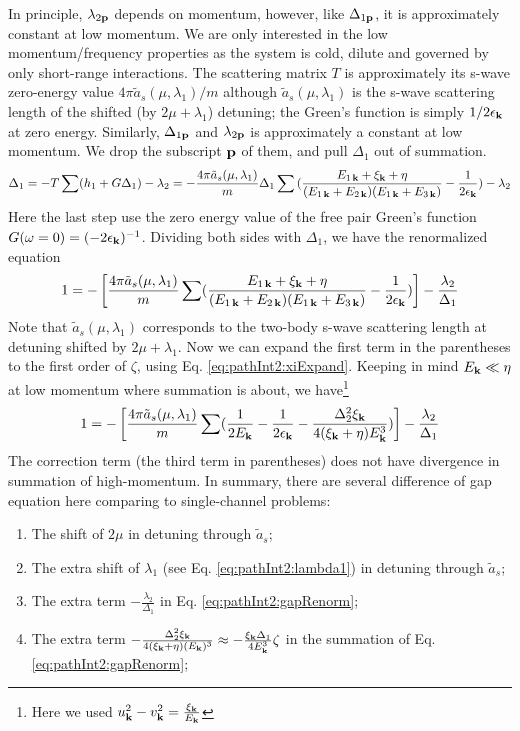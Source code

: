 In principle, $\lambda_{2\mathbf{p}}$ depends on momentum, however, like $\Delta_{1\mathbf{p}}$, it is approximately constant at low momentum.
We are only interested in the low momentum/frequency properties as the system is cold, dilute and governed by only short-range interactions. The scattering matrix $T$ is approximately its s-wave zero-energy value ${4\pi{\tilde{a}_{s}(\mu,\lambda_{1})}}/{m}$ although $\tilde{a}_{s}(\mu,\lambda_{1})$ is the s-wave scattering length of the shifted (by $2\mu+\lambda_{1}$) detuning; the Green's function is simply $1/2\epsilon_{\mathbf{k}}$ at zero energy.   Similarly,   $\Delta_{1\mathbf{p}}$ and $\lambda_{2\mathbf{p}}$ is approximately a constant at low momentum.  We drop the subscript $\mathbf{p}$ of them, and pull $\Delta_{1}$ out of summation. 
\begin{equation}
\Delta_{1}=-T\sum(h_{1}+G\Delta_{1})-\lambda_{2}
=-\frac{4\pi{\tilde{a}_{s}(\mu,\lambda_{1})}}{m}\Delta_{1}\sum{}(\frac{E_{1\,\mathbf{k}}+\xi_{\mathbf{k}}+\eta}{(E_{1\,\mathbf{k}}+E_{2\,\mathbf{k}})(E_{1\,\mathbf{k}}+E_{3\,\mathbf{k}})}-\frac{1}{2\epsilon_{\mathbf{k}}})
	-\lambda_{2}
\end{equation}
Here the last step use the zero energy value of the free pair Green's function $G(\omega=0)=(-2\epsilon_{\mathbf{k}})^{-1}$. Dividing both sides with $\Delta_{1}$, we have the renormalized equation
\begin{equation}
1=-\left[\frac{4\pi{\tilde{a}_{s}(\mu,\lambda_{1})}}{m}\sum(\frac{E_{1\,\mathbf{k}}+\xi_{\mathbf{k}}+\eta}{(E_{1\,\mathbf{k}}+E_{2\,\mathbf{k}})(E_{1\,\mathbf{k}}+E_{3\,\mathbf{k}})}-\frac{1}{2\epsilon_{\mathbf{k}}})\right]
	-\frac{\lambda_{2}}{\Delta_{1}}
\end{equation}
Note that $\tilde{a}_{s}(\mu,\lambda_{1})$ corresponds to the two-body s-wave scattering length at detuning shifted by $2\mu+\lambda_{1}$.
Now we can expand the first term in the parentheses to the first order of $\zeta$, using Eq. \ref{eq:pathInt2:xiExpand}. Keeping in mind $E_{\mathbf{k}}\ll{\eta}$ at low momentum where summation is about, we have\footnote{Here we used $u_{\mathbf{k}}^{2}-v_{\mathbf{k}}^{2}=\frac{\xi_{\mathbf{k}}}{E_{\mathbf{k}}}$}
\begin{equation}\label{eq:pathInt2:gapRenorm}
1=-\left[\frac{4\pi{\tilde{a}_{s}(\mu,\lambda_{1})}}{m}\sum(\frac{1}{2E_{\mathbf{k}}}-\frac{1}{2\epsilon_{\mathbf{k}}}-\frac{\Delta_{2}^{2}\xi_{\mathbf{k}}}{4(\xi_{\mathbf{k}}+\eta){E_{\mathbf{k}}^{3}}})\right]
	-\frac{\lambda_{2}}{\Delta_{1}}
\end{equation}
The correction term (the third term in parentheses) does not have divergence in summation of high-momentum. 
In summary, there are several difference of gap equation here comparing to single-channel problems:
\begin{enumerate}
\item\label{item:pathInt2:mu}The shift of $2\mu$ in detuning through $\tilde{a}_{s}$;
\item The extra shift of $\lambda_{1}$ (see Eq. \ref{eq:pathInt2:lambda1}) in detuning through $\tilde{a}_{s}$;
\item The extra term $-\frac{\lambda_{2}}{\Delta_{1}}$ in Eq. \ref{eq:pathInt2:gapRenorm};
\item The extra term $-\frac{\Delta_{2}^{2}\xi_{\mathbf{k}}}{4(\xi_{\mathbf{k}}+\eta){(E_{\mathbf{k}})^{3}}}\approx-\frac{\xi_{\mathbf{k}}\Delta_{1}}{4{E_{\mathbf{k}}^{3}}}\zeta$ in the summation of Eq. \ref{eq:pathInt2:gapRenorm};
\end{enumerate}

